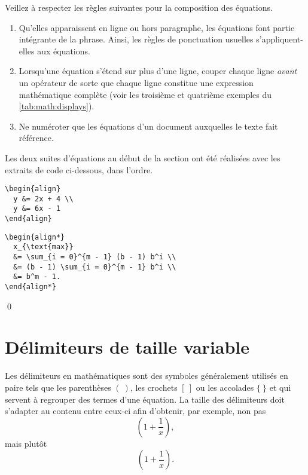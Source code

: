 \begin{conseil}
  Veillez à respecter les règles suivantes pour la composition des
  équations.
  \begin{enumerate}
  \item Qu'elles apparaissent en ligne ou hors paragraphe, les
    équations font partie intégrante de la phrase. Ainsi, les règles
    de ponctuation usuelles s'appliquent-elles aux équations.
  \item Lorsqu'une équation s'étend sur plus d'une ligne, couper
    chaque ligne \emph{avant} un opérateur de sorte que chaque ligne
    constitue une expression mathématique complète (voir les troisième
    et quatrième exemples du \autoref{tab:math:displays}).
  \item Ne numéroter que les équations d'un document auxquelles le
    texte fait référence.
  \end{enumerate}
\end{conseil}

\begin{exemple}
  Les deux suites d'équations au début de la section ont été réalisées
  avec les extraits de code ci-dessous, dans l'ordre.
\begin{lstlisting}
\begin{align}
  y &= 2x + 4 \\
  y &= 6x - 1
\end{align}
\end{lstlisting}
\begin{lstlisting}
\begin{align*}
  x_{\text{max}}
  &= \sum_{i = 0}^{m - 1} (b - 1) b^i \\
  &= (b - 1) \sum_{i = 0}^{m - 1} b^i \\
  &= b^m - 1.
\end{align*}
\end{lstlisting}
  \qed
\end{exemple}


\section{Délimiteurs de taille variable}
\label{sec:math:delimiteurs}

Les délimiteurs en mathématiques sont des symboles généralement
utilisés en paire tels que les parenthèses $(~)$, les crochets $[~]$
ou les accolades $\{~\}$ et qui servent à regrouper des termes d'une
équation. La taille des délimiteurs doit s'adapter au contenu entre
ceux-ci afin d'obtenir, par exemple, non pas
\begin{equation*}
  (1 + \frac{1}{x}),
\end{equation*}
mais plutôt
\begin{equation*}
  \left( 1 + \frac{1}{x} \right).
\end{equation*}


